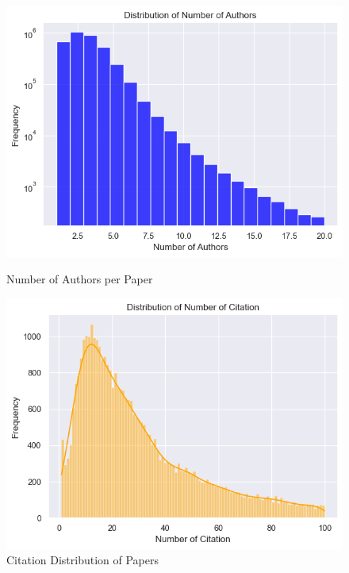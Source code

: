 \documentclass[11pt]{article}
\begin{document}
\begin{figure}[htbp]
	\centering
	\begin{minipage}{0.24\textwidth}
		\includegraphics[width=\textwidth]{img/preprocess/num_authors.png}
		\caption{Number of Authors per Paper}
		\label{fig:num_authors_per_paper}
	\end{minipage} \hfill
	\begin{minipage}{0.24\textwidth}
		\includegraphics[width=\textwidth]{img/preprocess/num_citations.png}
		\caption{Citation Distribution of Papers}
		\label{fig:citation_distribution}
	\end{minipage} \hfill
	\begin{minipage}{0.24\textwidth}

\end{minipage}
\end{figure}
\end{document}
